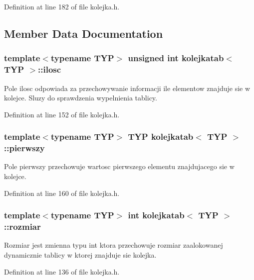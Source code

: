 Definition at line 182 of file kolejka.\-h.



\subsection{Member Data Documentation}
\hypertarget{classkolejkatab_a161d4a2c4e17bd942ca79ae3a421ff34}{
\subsubsection[{ilosc}]{\setlength{\rightskip}{0pt plus 5cm}template$<$typename T\-Y\-P$>$ unsigned int {\bf kolejkatab}$<$ T\-Y\-P $>$\-::ilosc}}\label{classkolejkatab_a161d4a2c4e17bd942ca79ae3a421ff34}
Pole ilosc odpowiada za przechowywanie informacji ile elementow znajduje sie w kolejce. Sluzy do sprawdzenia wypelnienia tablicy. 

Definition at line 152 of file kolejka.\-h.

\hypertarget{classkolejkatab_a9eac0eb1ac26bedc608938e7865b6352}{
\subsubsection[{pierwszy}]{\setlength{\rightskip}{0pt plus 5cm}template$<$typename T\-Y\-P$>$ T\-Y\-P {\bf kolejkatab}$<$ T\-Y\-P $>$\-::pierwszy}}\label{classkolejkatab_a9eac0eb1ac26bedc608938e7865b6352}
Pole pierwszy przechowuje wartosc pierwszego elementu znajdujacego sie w kolejce. 

Definition at line 160 of file kolejka.\-h.

\hypertarget{classkolejkatab_a77ad076380322b9698305c608aab6637}{
\subsubsection[{rozmiar}]{\setlength{\rightskip}{0pt plus 5cm}template$<$typename T\-Y\-P$>$ int {\bf kolejkatab}$<$ T\-Y\-P $>$\-::rozmiar}}\label{classkolejkatab_a77ad076380322b9698305c608aab6637}
Rozmiar jest zmienna typu int ktora przechowuje rozmiar zaalokowanej dynamicznie tablicy w ktorej znajduje sie kolejka. 

Definition at line 136 of file kolejka.\-h.


